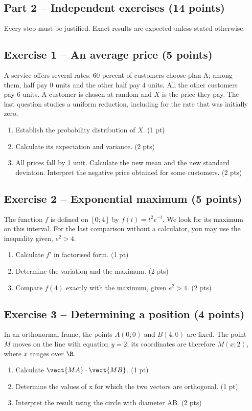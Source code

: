 \clearpage\subsection*{Part 2 -- Independent exercises (14 points)}
Every step must be justified. Exact results are expected unless stated otherwise.
\subsection*{Exercise 1 -- An average price (5 points)}
A service offers several rates. 60 percent of customers choose plan A; among them, half pay 0 units and the other half pay 4 units. All the other customers pay 6 units. A customer is chosen at random and $X$ is the price they pay. The last question studies a uniform reduction, including for the rate that was initially zero.
\begin{enumerate}
\item Establish the probability distribution of $X$. \hfill(1 pt)
\item Calculate its expectation and variance. \hfill(2 pts)
\item All prices fall by 1 unit. Calculate the new mean and the new standard deviation. Interpret the negative price obtained for some customers. \hfill(2 pts)
\end{enumerate}
\subsection*{Exercise 2 -- Exponential maximum (5 points)}
The function $f$ is defined on $[0;4]$ by $f(t)=t^2e^{-t}$. We look for its maximum on this interval. For the last comparison without a calculator, you may use the inequality given, $e^2>4$.
\begin{enumerate}
\item Calculate $f\prime$ in factorised form. \hfill(1 pt)
\item Determine the variation and the maximum. \hfill(2 pts)
\item Compare $f(4)$ exactly with the maximum, given $e^2>4$. \hfill(2 pts)
\end{enumerate}
\subsection*{Exercise 3 -- Determining a position (4 points)}
In an orthonormal frame, the points $A(0;0)$ and $B(4;0)$ are fixed. The point $M$ moves on the line with equation $y=2$; its coordinates are therefore $M(x;2)$, where $x$ ranges over $\R$.
\begin{enumerate}
\item Calculate $\vect{MA}\cdot\vect{MB}$. \hfill(1 pt)
\item Determine the values of x for which the two vectors are orthogonal. \hfill(1 pt)
\item Interpret the result using the circle with diameter AB. \hfill(2 pts)
\end{enumerate}
